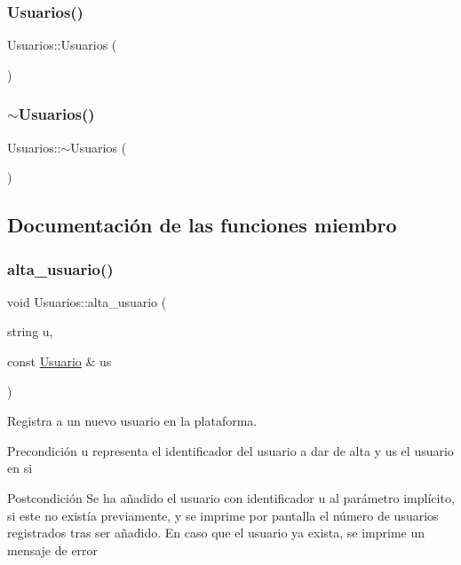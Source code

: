 \subsubsection{\texorpdfstring{Usuarios()}{Usuarios()}}
{\footnotesize\ttfamily Usuarios\+::\+Usuarios (\begin{DoxyParamCaption}{ }\end{DoxyParamCaption})}

\mbox{\label{class_usuarios_a6ca03accac71e8267f98558b18f8b78e}} 
\subsubsection{\texorpdfstring{$\sim$\+Usuarios()}{~Usuarios()}}
{\footnotesize\ttfamily Usuarios\+::$\sim$\+Usuarios (\begin{DoxyParamCaption}{ }\end{DoxyParamCaption})}



\subsection{Documentación de las funciones miembro}
\mbox{\label{class_usuarios_aae1a0ac8740e6396a6325d56043060f8}} 
\subsubsection{\texorpdfstring{alta\+\_\+usuario()}{alta\_usuario()}}
{\footnotesize\ttfamily void Usuarios\+::alta\+\_\+usuario (\begin{DoxyParamCaption}\item[{string}]{u,  }\item[{const \mbox{\hyperlink{class_usuario}{Usuario}} \&}]{us }\end{DoxyParamCaption})}



Registra a un nuevo usuario en la plataforma. 

\begin{DoxyPrecond}{Precondición}
u representa el identificador del usuario a dar de alta y us el usuario en si 
\end{DoxyPrecond}
\begin{DoxyPostcond}{Postcondición}
Se ha añadido el usuario con identificador u al parámetro implícito, si este no existía previamente, y se imprime por pantalla el número de usuarios registrados tras ser añadido. En caso que el usuario ya exista, se imprime un mensaje de error 
\end{DoxyPostcond}
\mbox{\label{class_usuarios_a11e75ce29066b53e84731315ef476312}} 
